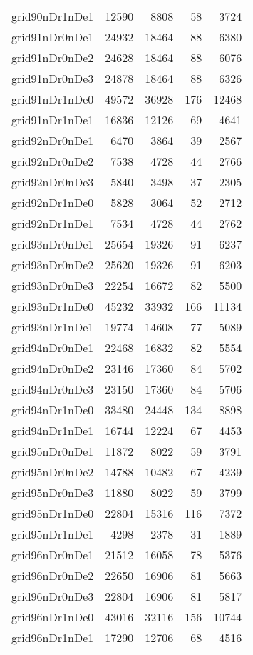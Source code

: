 \begin{tabular}{lrrrr}
grid90nDr1nDe1 & 12590 & 8808 & 58 & 3724 \\
grid91nDr0nDe1 & 24932 & 18464 & 88 & 6380 \\
grid91nDr0nDe2 & 24628 & 18464 & 88 & 6076 \\
grid91nDr0nDe3 & 24878 & 18464 & 88 & 6326 \\
grid91nDr1nDe0 & 49572 & 36928 & 176 & 12468 \\
grid91nDr1nDe1 & 16836 & 12126 & 69 & 4641 \\
grid92nDr0nDe1 & 6470 & 3864 & 39 & 2567 \\
grid92nDr0nDe2 & 7538 & 4728 & 44 & 2766 \\
grid92nDr0nDe3 & 5840 & 3498 & 37 & 2305 \\
grid92nDr1nDe0 & 5828 & 3064 & 52 & 2712 \\
grid92nDr1nDe1 & 7534 & 4728 & 44 & 2762 \\
grid93nDr0nDe1 & 25654 & 19326 & 91 & 6237 \\
grid93nDr0nDe2 & 25620 & 19326 & 91 & 6203 \\
grid93nDr0nDe3 & 22254 & 16672 & 82 & 5500 \\
grid93nDr1nDe0 & 45232 & 33932 & 166 & 11134 \\
grid93nDr1nDe1 & 19774 & 14608 & 77 & 5089 \\
grid94nDr0nDe1 & 22468 & 16832 & 82 & 5554 \\
grid94nDr0nDe2 & 23146 & 17360 & 84 & 5702 \\
grid94nDr0nDe3 & 23150 & 17360 & 84 & 5706 \\
grid94nDr1nDe0 & 33480 & 24448 & 134 & 8898 \\
grid94nDr1nDe1 & 16744 & 12224 & 67 & 4453 \\
grid95nDr0nDe1 & 11872 & 8022 & 59 & 3791 \\
grid95nDr0nDe2 & 14788 & 10482 & 67 & 4239 \\
grid95nDr0nDe3 & 11880 & 8022 & 59 & 3799 \\
grid95nDr1nDe0 & 22804 & 15316 & 116 & 7372 \\
grid95nDr1nDe1 & 4298 & 2378 & 31 & 1889 \\
grid96nDr0nDe1 & 21512 & 16058 & 78 & 5376 \\
grid96nDr0nDe2 & 22650 & 16906 & 81 & 5663 \\
grid96nDr0nDe3 & 22804 & 16906 & 81 & 5817 \\
grid96nDr1nDe0 & 43016 & 32116 & 156 & 10744 \\
grid96nDr1nDe1 & 17290 & 12706 & 68 & 4516 \\

\end{tabular}
